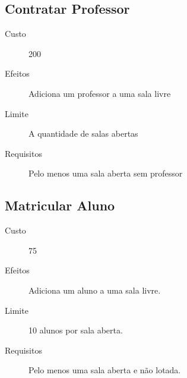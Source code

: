 \documentclass[brazil,times]{abnt}
\begin{document}
\subsection{Contratar Professor}
\begin{description}
	\item[Custo]  200
	\item[Efeitos] Adiciona um professor a uma sala livre
	\item[Limite] A quantidade de salas abertas
	\item[Requisitos] Pelo menos uma sala aberta sem professor
\end{description}

\subsection{Matricular Aluno}
\begin{description}
	\item[Custo]  75
	\item[Efeitos] Adiciona um aluno a uma sala livre.
	\item[Limite] 10 alunos por sala aberta.
	\item[Requisitos] Pelo menos uma sala aberta e não lotada.
\end{description}


%
%
\end{document}
